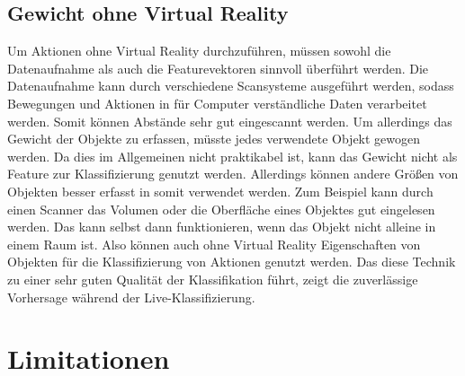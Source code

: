 \subsection{Gewicht ohne Virtual Reality}
\label{subsec:gewicht-ohne-virtual-reality}
Um Aktionen ohne Virtual Reality durchzuführen, müssen sowohl die Datenaufnahme als auch die Featurevektoren sinnvoll überführt werden. Die Datenaufnahme kann durch verschiedene Scansysteme ausgeführt werden, sodass Bewegungen und Aktionen in für Computer verständliche Daten verarbeitet werden. Somit können Abstände sehr gut eingescannt werden. Um allerdings das Gewicht der Objekte zu erfassen, müsste jedes verwendete Objekt gewogen werden. Da dies im Allgemeinen nicht praktikabel ist, kann das Gewicht nicht als Feature zur Klassifizierung genutzt werden. Allerdings können andere Größen von Objekten besser erfasst in somit verwendet werden. Zum Beispiel kann durch einen Scanner das Volumen oder die Oberfläche eines Objektes gut eingelesen werden. Das kann selbst dann funktionieren, wenn das Objekt nicht alleine in einem Raum ist. Also können auch ohne Virtual Reality Eigenschaften von Objekten für die Klassifizierung von Aktionen genutzt werden. Das diese Technik zu einer sehr guten Qualität der Klassifikation führt, zeigt die zuverlässige Vorhersage während der Live-Klassifizierung.


\section{Limitationen}
\label{sec:limitation}

